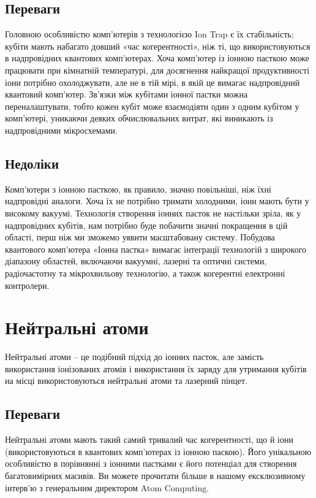 \documentclass[a4paper,14pt]{extreport}
\begin{document}
\section{Переваги}
Головною особливістю комп’ютерів з технологією Ion Trap є їх стабільність; кубіти мають набагато довший «час когерентності», ніж ті, що використовуються в надпровідних квантових комп’ютерах. Хоча комп’ютер із іонною пасткою може працювати при кімнатній температурі, для досягнення найкращої продуктивності іони потрібно охолоджувати, але не в тій мірі, в якій це вимагає надпровідний квантовий комп’ютер. Зв’язки між кубітами іонної пастки можна переналаштувати, тобто кожен кубіт може взаємодіяти один з одним кубітом у комп’ютері, уникаючи деяких обчислювальних витрат, які виникають із надпровідними мікросхемами.
\section{Недоліки}
Комп’ютери з іонною пасткою, як правило, значно повільніші, ніж їхні надпровідні аналоги. Хоча їх не потрібно тримати холодними, іони мають бути у високому вакуумі. Технологія створення іонних пасток не настільки зріла, як у надпровідних кубітів, нам потрібно буде побачити значні покращення в цій області, перш ніж ми зможемо уявити масштабовану систему. Побудова квантового комп’ютера «Іонна пастка» вимагає інтеграції технологій з широкого діапазону областей, включаючи вакуумні, лазерні та оптичні системи, радіочастотну та мікрохвильову технологію, а також когерентні електронні контролери.




\chapter{Нейтральні атоми}\par 
Нейтральні атоми – це подібний підхід до іонних пасток, але замість використання іонізованих атомів і використання їх заряду для утримання кубітів на місці використовуються нейтральні атоми та лазерний пінцет.
\section{Переваги}
Нейтральні атоми мають такий самий тривалий час когерентності, що й іони (використовуються в квантових комп’ютерах із іонною паскою). Його унікальною особливістю в порівнянні з іонними пастками є його потенціал для створення багатовимірних масивів. Ви можете прочитати більше в нашому ексклюзивному інтерв’ю з генеральним директором Atom Computing.
\end{document}
